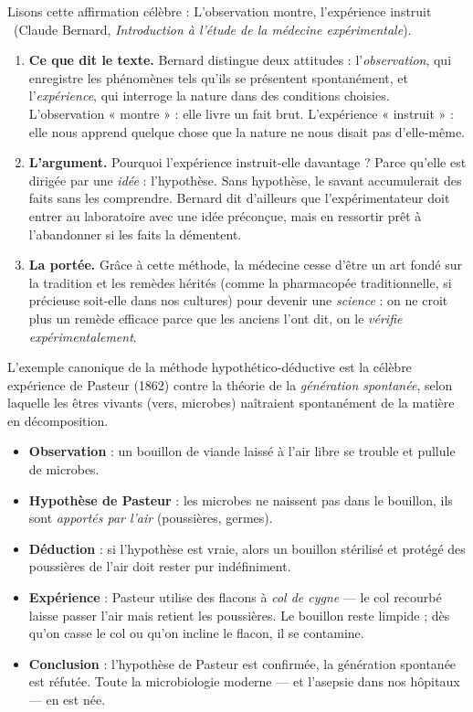 \documentclass[11pt]{article}
\newcommand{\cle}[1]{{\popxbold\color{popdark}#1}}
\begin{document}
\begin{experience}
Lisons cette affirmation célèbre : \guillemotleft L'observation montre, l'expérience instruit \guillemotright\ (Claude Bernard, \emph{Introduction à l'étude de la médecine expérimentale}).
\begin{enumerate}
\item \textbf{Ce que dit le texte.} Bernard distingue deux attitudes : l'\emph{observation}, qui enregistre les phénomènes tels qu'ils se présentent spontanément, et l'\emph{expérience}, qui interroge la nature dans des conditions choisies. L'observation « montre » : elle livre un fait brut. L'expérience « instruit » : elle nous apprend quelque chose que la nature ne nous disait pas d'elle-même.
\item \textbf{L'argument.} Pourquoi l'expérience instruit-elle davantage ? Parce qu'elle est dirigée par une \emph{idée} : l'hypothèse. Sans hypothèse, le savant accumulerait des faits sans les comprendre. Bernard dit d'ailleurs que l'expérimentateur doit entrer au laboratoire avec une idée préconçue, mais en ressortir prêt à l'abandonner si les faits la démentent.
\item \textbf{La portée.} Grâce à cette méthode, la médecine cesse d'être un art fondé sur la tradition et les remèdes hérités (comme la pharmacopée traditionnelle, si précieuse soit-elle dans nos cultures) pour devenir une \emph{science} : on ne croit plus un remède efficace parce que les anciens l'ont dit, on le \emph{vérifie expérimentalement}.
\end{enumerate}
\end{experience}

\begin{exemplebox}
L'exemple canonique de la méthode hypothético-déductive est la célèbre expérience de \cle{Pasteur} (1862) contre la théorie de la \emph{génération spontanée}, selon laquelle les êtres vivants (vers, microbes) naîtraient spontanément de la matière en décomposition.
\begin{itemize}
\item \textbf{Observation} : un bouillon de viande laissé à l'air libre se trouble et pullule de microbes.
\item \textbf{Hypothèse de Pasteur} : les microbes ne naissent pas dans le bouillon, ils sont \emph{apportés par l'air} (poussières, germes).
\item \textbf{Déduction} : si l'hypothèse est vraie, alors un bouillon stérilisé et protégé des poussières de l'air doit rester pur indéfiniment.
\item \textbf{Expérience} : Pasteur utilise des flacons à \emph{col de cygne} — le col recourbé laisse passer l'air mais retient les poussières. Le bouillon reste limpide ; dès qu'on casse le col ou qu'on incline le flacon, il se contamine.
\item \textbf{Conclusion} : l'hypothèse de Pasteur est confirmée, la génération spontanée est réfutée. Toute la microbiologie moderne — et l'asepsie dans nos hôpitaux — en est née.
\end{itemize}
\end{exemplebox}
\end{document}
